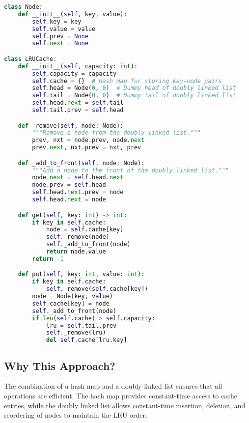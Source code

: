 \begin{fullwidth}
\begin{lstlisting}[language=Python]
class Node:
    def __init__(self, key, value):
        self.key = key
        self.value = value
        self.prev = None
        self.next = None

class LRUCache:
    def __init__(self, capacity: int):
        self.capacity = capacity
        self.cache = {}  # Hash map for storing key-node pairs
        self.head = Node(0, 0)  # Dummy head of doubly linked list
        self.tail = Node(0, 0)  # Dummy tail of doubly linked list
        self.head.next = self.tail
        self.tail.prev = self.head

    def _remove(self, node: Node):
        """Remove a node from the doubly linked list."""
        prev, nxt = node.prev, node.next
        prev.next, nxt.prev = nxt, prev

    def _add_to_front(self, node: Node):
        """Add a node to the front of the doubly linked list."""
        node.next = self.head.next
        node.prev = self.head
        self.head.next.prev = node
        self.head.next = node

    def get(self, key: int) -> int:
        if key in self.cache:
            node = self.cache[key]
            self._remove(node)
            self._add_to_front(node)
            return node.value
        return -1

    def put(self, key: int, value: int):
        if key in self.cache:
            self._remove(self.cache[key])
        node = Node(key, value)
        self.cache[key] = node
        self._add_to_front(node)
        if len(self.cache) > self.capacity:
            lru = self.tail.prev
            self._remove(lru)
            del self.cache[lru.key]
\end{lstlisting}
\end{fullwidth}

\subsection*{Why This Approach?}
The combination of a hash map and a doubly linked list ensures that all operations are efficient. The hash map provides constant-time access to cache entries, while the doubly linked list allows constant-time insertion, deletion, and reordering of nodes to maintain the LRU order.


